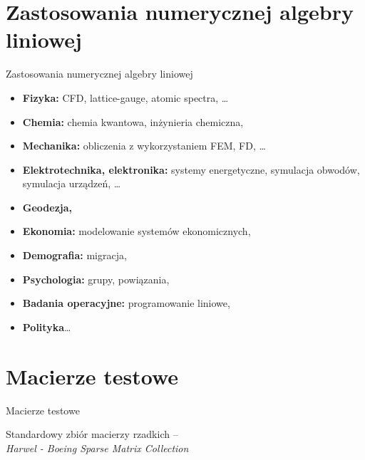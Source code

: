 \section{Zastosowania numerycznej algebry liniowej}

\begin{frame}{Zastosowania numerycznej algebry liniowej}


  \begin{itemize}
    \item \textbf{Fizyka:} CFD, lattice-gauge, atomic spectra, \dots
    \item \textbf{Chemia:} chemia kwantowa, inżynieria chemiczna, 
    \item \textbf{Mechanika:} obliczenia z wykorzystaniem FEM, FD, \dots
    \item \textbf{Elektrotechnika, elektronika:} systemy energetyczne, symulacja obwodów, symulacja urządzeń, \dots
    \item \textbf{Geodezja,}
    \item \textbf{Ekonomia:} modelowanie systemów ekonomicznych,
    \item \textbf{Demografia:} migracja,
    \item \textbf{Psychologia:} grupy, powiązania,
    \item \textbf{Badania operacyjne:} programowanie liniowe,
    \item \textbf{Polityka}\dots
  \end{itemize}
\end{frame}

\section{Macierze testowe}
\begin{frame}{Macierze testowe}
\begin{block}{}
Standardowy zbiór macierzy rzadkich -- \\ 
\textit{Harwel - Boeing Sparse Matrix Collection} \cite{matrix}
\end{block}
\end{frame}
